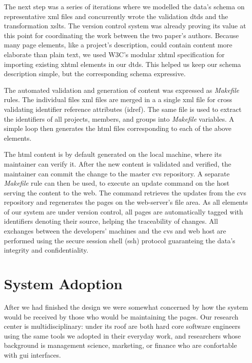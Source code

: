 \documentclass[10pt]{article}
\begin{document}
The next step was a series of iterations where we
modelled the data's schema on representative {\sc xml}
files and concurrently wrote the validation {\sc dtd}s
and the transformation {\sc xslt}s.
The version control system was already proving its value
at this point
for coordinating the work between the two paper's authors.
Because many page elements, like a project's description,
could contain content more elaborate than plain text,
we used W3C's modular {\sc xhtml} specification for
importing existing {\sc xhtml} elements in our {\sc dtd}s.
This helped us keep our schema description simple,
but the corresponding schema expressive.

The automated validation and generation of content was
expressed as {\em Makefile} rules.
The individual files {\sc xml} files are merged in a a
single {\sc xml} file for cross validating identifier
reference attributes ({\sc idref}).
The same file is used to extract the identifiers of
all projects, members, and groups into {\em Makefile}
variables.
A simple loop then generates the {\sc html} files
corresponding to each of the above elements.

The {\sc html} content is by default generated on the
local machine, where its maintainer can verify it.
After the new content is validated and verified,
the maintainer can commit the change to the master
{\sc cvs} repository.
A separate {\em Makefile} rule can then be used,
to execute an update command on the
host serving the content to the web.
The command retrieves the updates from the {\sc cvs}
repository and regenerates the pages on the web-server's
file area.
As all elements of our system are under version control,
all pages are automatically tagged with identifiers
denoting their source, helping the traceability of changes.
All exchanges between the developers' machines and the
{\sc cvs} and web host are performed using the secure session
shell ({\sc ssh}) protocol guaranteing the data's integrity
and confidentiality.

\section{System Adoption}
\label{sec:adopt}
After we had finished the design we were somewhat concerned
by how the system would be received by those who would be
maintaining the pages.
Our research center is multidisciplinary: under its roof
are both hard core software engineers using the same tools
we adopted in their everyday work, and researchers whose
background is management science, marketing, or finance
who are confortable with {\sc gui} interfaces.
\end{document}

